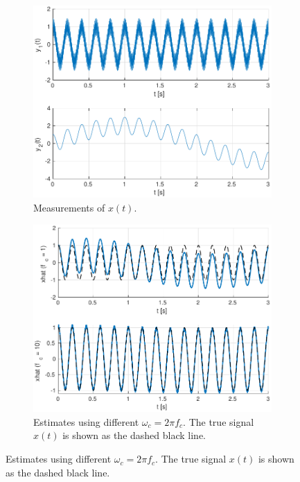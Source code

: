 \documentclass[a4paper]{article}
\begin{document}
\begin{figure}[h]
  \centering
  \begin{subfigure}[t]{0.32\textwidth}
    \includegraphics[width=\textwidth]{scf_meas.pdf}
    \caption{Measurements of $x(t)$.}
    \label{fig:scf_meas}
  \end{subfigure}\hfill
  \begin{subfigure}[t]{0.32\textwidth}
    \includegraphics[width=\textwidth]{scf_est.pdf}
    \caption{Estimates using different $\omega_c=2\pi f_c$. The true signal $x(t)$ is shown as the dashed black line.}
    \label{fig:scf_est}
  \end{subfigure}\hfill

\end{figure}
\end{document}
